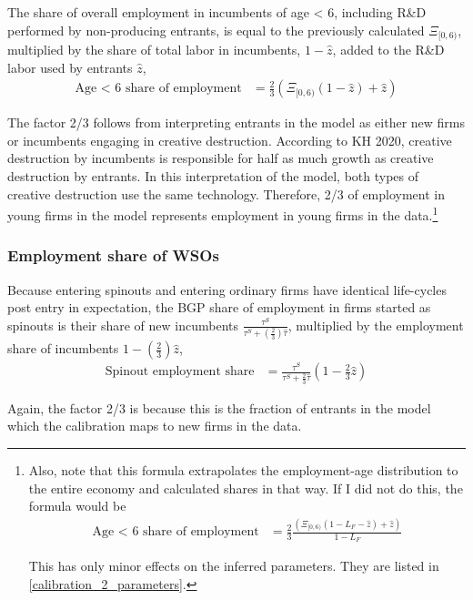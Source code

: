 \documentclass[11pt,english]{article}
\begin{document}
The share of overall employment in incumbents of age < 6, including R\&D performed by non-producing entrants, is equal to the previously calculated $\Xi_{[0,6)}$, multiplied by the share of total labor in incumbents, $1 - \hat{z}$, added to the R\&D labor used by entrants $\hat{z}$, 
\begin{align*}
\textrm{Age < 6 share of employment} &= \frac{2}{3}(\Xi_{[0,6)} (1-\hat{z}) + \hat{z})
\end{align*}

The factor 2/3 follows from interpreting entrants in the model as either new firms or incumbents engaging in creative destruction. According to KH 2020, creative destruction by incumbents is responsible for half as much growth as creative destruction by entrants. In this interpretation of the model, both types of creative destruction use the same technology. Therefore, 2/3 of employment in young firms in the model represents employment in young firms in the data.\footnote{Also, note that this formula extrapolates the employment-age distribution to the entire economy and calculated shares in that way. If I did not do this, the formula would be
	\begin{align*}
	\textrm{Age < 6 share of employment} &= \frac{2}{3} \frac{(\Xi_{[0,6)} (1 - L_F -\hat{z}) + \hat{z})}{1-L_F}
	\end{align*}
	
	This has only minor effects on the inferred parameters. They are listed in \autoref{calibration_2_parameters}.}

\subsubsection{Employment share of WSOs}\label{appendix:calibration:WSOempShare}

Because entering spinouts and entering ordinary firms have identical life-cycles post entry in expectation, the BGP share of employment in firms started as spinouts is their share of new incumbents $\frac{\tau^S}{\tau^S+ (\frac{2}{3})\hat{\tau}}$, multiplied by the employment share of incumbents $1- (\frac{2}{3})\hat{z}$, 
\begin{align*}
\textrm{Spinout employment share} &= \frac{\tau^S}{\tau^S + \frac{2}{3}\hat{\tau}} (1 - \frac{2}{3}\hat{z}) 
\end{align*}

Again, the factor 2/3 is because this is the fraction of entrants in the model which the calibration maps to new firms in the data.
\end{document}
